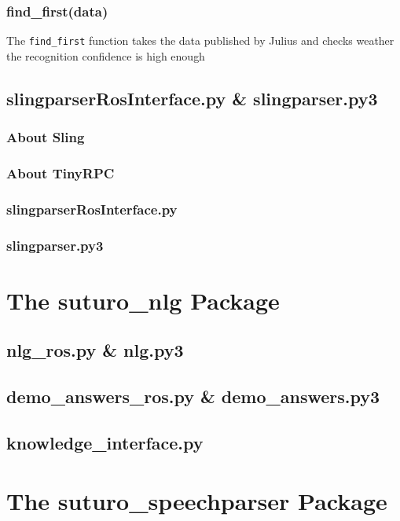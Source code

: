 \documentclass[main.tex]{subfiles}
\begin{document}
		\subsubsection{find\_first(data)}
		The \texttt{find\_first} function takes the data published by Julius and checks weather the recognition confidence is high enough 
		
		\subsection{slingparserRosInterface.py \& slingparser.py3}	
		\subsubsection{About Sling}
		\subsubsection{About TinyRPC}
		\subsubsection{slingparserRosInterface.py}
		\subsubsection{slingparser.py3}
			
	
	\section{The suturo\_nlg Package}
		\subsection{nlg\_ros.py \& nlg.py3}
		\subsection{demo\_answers\_ros.py \& demo\_answers.py3}
		\subsection{knowledge\_interface.py}
			
	\section{The suturo\_speechparser Package}
		
		
		
\end{document}
